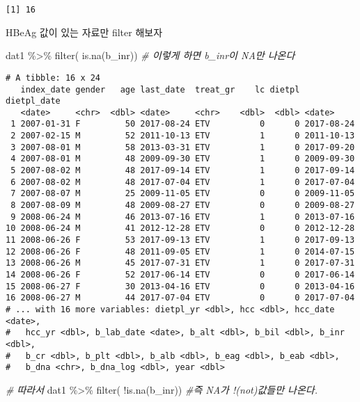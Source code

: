 \documentclass[
]{article}
\newenvironment{Shaded}{\begin{snugshade}}{\end{snugshade}}
\newcommand{\CommentTok}[1]{\textcolor[rgb]{0.56,0.35,0.01}{\textit{#1}}}
\newcommand{\FunctionTok}[1]{\textcolor[rgb]{0.00,0.00,0.00}{#1}}
\newcommand{\NormalTok}[1]{#1}
\newcommand{\SpecialCharTok}[1]{\textcolor[rgb]{0.00,0.00,0.00}{#1}}
\begin{document}
\begin{verbatim}
[1] 16
\end{verbatim}

HBeAg 값이 있는 자료만 filter 해보자

\begin{Shaded}
\begin{Highlighting}[]
\NormalTok{dat1 }\SpecialCharTok{\%\textgreater{}\%} 
   \FunctionTok{filter}\NormalTok{( }\FunctionTok{is.na}\NormalTok{(b\_inr)) }\CommentTok{\# 이렇게 하면 b\_inr이 NA만 나온다}
\end{Highlighting}
\end{Shaded}

\begin{verbatim}
# A tibble: 16 x 24
   index_date gender   age last_date  treat_gr    lc dietpl dietpl_date
   <date>     <chr>  <dbl> <date>     <chr>    <dbl>  <dbl> <date>     
 1 2007-01-31 F         50 2017-08-24 ETV          0      0 2017-08-24 
 2 2007-02-15 M         52 2011-10-13 ETV          1      0 2011-10-13 
 3 2007-08-01 M         58 2013-03-31 ETV          1      0 2017-09-20 
 4 2007-08-01 M         48 2009-09-30 ETV          1      0 2009-09-30 
 5 2007-08-02 M         48 2017-09-14 ETV          1      0 2017-09-14 
 6 2007-08-02 M         48 2017-07-04 ETV          1      0 2017-07-04 
 7 2007-08-07 M         25 2009-11-05 ETV          0      0 2009-11-05 
 8 2007-08-09 M         48 2009-08-27 ETV          0      0 2009-08-27 
 9 2008-06-24 M         46 2013-07-16 ETV          1      0 2013-07-16 
10 2008-06-24 M         41 2012-12-28 ETV          0      0 2012-12-28 
11 2008-06-26 F         53 2017-09-13 ETV          1      0 2017-09-13 
12 2008-06-26 F         48 2011-09-05 ETV          1      0 2014-07-15 
13 2008-06-26 M         45 2017-07-31 ETV          1      0 2017-07-31 
14 2008-06-26 F         52 2017-06-14 ETV          0      0 2017-06-14 
15 2008-06-27 F         30 2013-04-16 ETV          0      0 2013-04-16 
16 2008-06-27 M         44 2017-07-04 ETV          0      0 2017-07-04 
# ... with 16 more variables: dietpl_yr <dbl>, hcc <dbl>, hcc_date <date>,
#   hcc_yr <dbl>, b_lab_date <date>, b_alt <dbl>, b_bil <dbl>, b_inr <dbl>,
#   b_cr <dbl>, b_plt <dbl>, b_alb <dbl>, b_eag <dbl>, b_eab <dbl>,
#   b_dna <chr>, b_dna_log <dbl>, year <dbl>
\end{verbatim}

\begin{Shaded}
\begin{Highlighting}[]
\CommentTok{\# 따라서}
\NormalTok{dat1 }\SpecialCharTok{\%\textgreater{}\%} 
   \FunctionTok{filter}\NormalTok{( }\SpecialCharTok{!}\FunctionTok{is.na}\NormalTok{(b\_inr)) }\CommentTok{\#즉 NA가 !(not)값들만 나온다.}
\end{Highlighting}
\end{Shaded}
\end{document}
